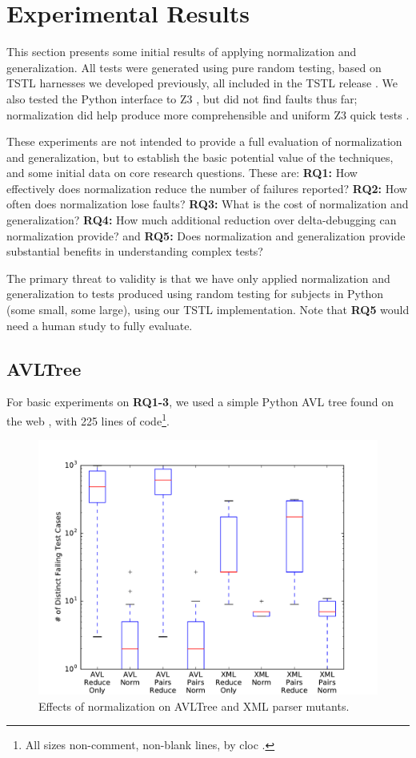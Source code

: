 \section {Experimental Results}

This section presents some initial results of applying normalization
and generalization.  All tests were generated using pure random testing,
based on TSTL harnesses we developed previously, all included in the
TSTL release \cite{tstl}.  We also tested the
Python interface to Z3 \cite{z3}, but did not find faults thus far;
normalization did help produce more comprehensible and uniform Z3
quick tests \cite{icst2014}.

These experiments are not intended to provide a full evaluation of
normalization and generalization, but to establish the basic potential
value of
the techniques, and some initial data on core research questions.
These are:
{\bf RQ1:} How effectively does normalization reduce the number of
failures reported? {\bf RQ2:} How often does normalization lose
faults? {\bf RQ3:} What is the cost of normalization and generalization? {\bf RQ4:} How
much additional reduction over delta-debugging can normalization
provide? and {\bf RQ5:} Does normalization and generalization provide
substantial benefits in understanding complex tests?

The primary
threat to validity is that we have only applied normalization and
generalization to tests produced using random testing for 
subjects in Python (some small, some large), using our TSTL
implementation.  Note that {\bf RQ5} would need a human study to fully evaluate.

\subsection{AVLTree}

For basic experiments on {\bf RQ1-3}, we used a
simple Python AVL tree found on the web
\cite{avltree}, with 225 lines of code\footnote{All sizes non-comment, non-blank lines, by cloc \cite{cloc}.}.

\begin{figure}
\includegraphics[width=\columnwidth]{length}
\caption{Effects of normalization on AVLTree and XML parser mutants.}
\label{normeffect}
\end{figure}

